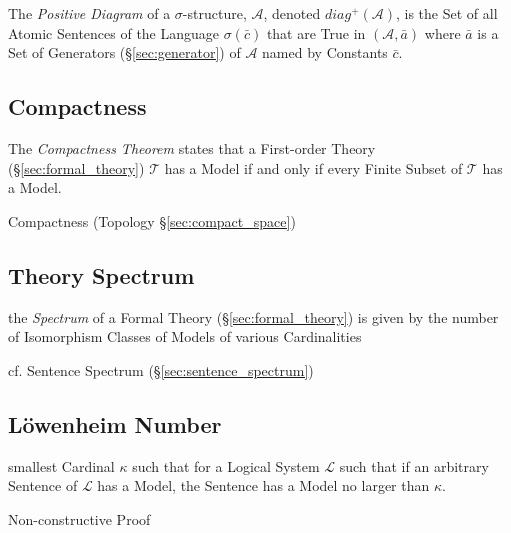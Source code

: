 The \emph{Positive Diagram} of a $\sigma$-structure, $\mathcal{A}$,
denoted $diag^+(\mathcal{A})$, is the Set of all Atomic Sentences of
the Language $\sigma(\bar{c})$ that are True in $(\mathcal{A},
\bar{a})$ where $\bar{a}$ is a Set of Generators
(\S\ref{sec:generator}) of $\mathcal{A}$ named by Constants $\bar{c}$.



\subsection{Compactness}\label{sec:compactness}

The \emph{Compactness Theorem} states that a First-order Theory
(\S\ref{sec:formal_theory}) $\mathcal{T}$ has a Model if and only if
every Finite Subset of $\mathcal{T}$ has a Model.

Compactness (Topology \S\ref{sec:compact_space})



\subsection{Theory Spectrum}\label{sec:theory_spectrum}

the \emph{Spectrum} of a Formal Theory (\S\ref{sec:formal_theory}) is given by
the number of Isomorphism Classes of Models of various Cardinalities

cf. Sentence Spectrum (\S\ref{sec:sentence_spectrum})



\subsection{L\"owenheim Number}\label{sec:lowenheim_number}

smallest Cardinal $\kappa$ such that for a Logical System
$\mathcal{L}$ such that if an arbitrary Sentence of $\mathcal{L}$ has
a Model, the Sentence has a Model no larger than $\kappa$.

Non-constructive Proof



